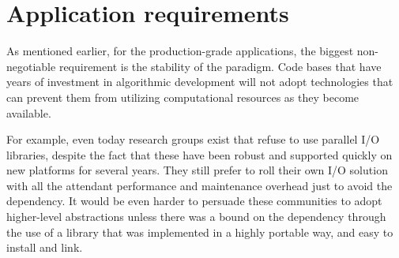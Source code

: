 

\section{Application requirements}
As mentioned earlier, for the production-grade applications, the
biggest non-negotiable requirement is the stability of the paradigm.
Code bases that have years of investment in algorithmic development will not
adopt technologies that can prevent them from utilizing computational
resources as they become available. 

For example, even today research groups exist that refuse to use
parallel I/O libraries, despite the fact that these have been robust
and supported quickly on new platforms for several years. They still
prefer to roll their own I/O solution with all the attendant
performance and maintenance overhead just to avoid the dependency. It
would be even harder to persuade these communities to adopt higher-level
abstractions unless there was a bound on the dependency through
the use of a library that was implemented in a highly portable way,
and easy to install and link.

